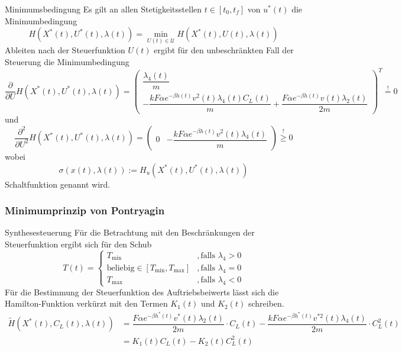\documentclass[aspectratio=169]{beamer}
\begin{document}
\begin{frame}
  \begin{block}{Minimumsbedingung}  
  \scriptsize
  Es gilt an allen Stetigkeitsstellen $t \in [t_0,t_f]$ von $u^{\ast}(t)$ die Minimumbedingung \[H(X^{\ast}(t),U^{\ast}(t),\lambda(t)) = \min_{U(t) \in \mathcal{U}} H(X^{\ast}(t),U(t),\lambda(t))\] Ableiten nach der Steuerfunktion $U(t)$ ergibt für den unbeschränkten Fall der Steuerung die Minimumbedingung
    \[\dfrac{\partial}{\partial U} H(X^{\ast}(t),U^{\ast}(t),\lambda(t)) = \begin{pmatrix}
    \dfrac{\lambda_4(t)}{m} \\ 
    - \dfrac{k F \alpha e^{-\beta h(t)} v^2(t) \lambda_4(t) C_L(t)}{m} + \dfrac{F \alpha e^{-\beta h(t)} v(t) \lambda_2(t)}{2m}
    \end{pmatrix}^T \stackrel{!}{=} 0\]
    und 
    \[\dfrac{\partial^2}{\partial U^2} H(X^{\ast}(t),U^{\ast}(t),\lambda(t)) = \begin{pmatrix}
    0 & - \dfrac{k F \alpha e^{-\beta h(t)} v^2(t) \lambda_4(t)}{m} 
    \end{pmatrix} \stackrel{!}{\geq} 0\] wobei \[\sigma(x(t),\lambda(t)) := H_u(X^{\ast}(t),U^{\ast}(t),\lambda(t))\] Schaltfunktion genannt wird. 
  \end{block}
\end{frame}

\begin{frame}
  \frametitle{Minimumprinzip von Pontryagin}
  \begin{block}{Synthesesteuerung}  
  \scriptsize
  Für die Betrachtung mit den Beschränkungen der Steuerfunktion ergibt sich für den Schub
\[T(t) = \left\lbrace \begin{array}{ll}
T_{\min} & ,\text{falls } \lambda_4 > 0  \\ 
\text{beliebig} \in [T_{\min},T_{\max}] & ,\text{falls } \lambda_4 = 0  \\ 
T_{\max} & ,\text{falls } \lambda_4 < 0
\end{array} \right.\]
Für die Bestimmung der Steuerfunktion des Auftriebsbeiwerts lässt sich die Hamilton-Funktion verkürzt mit den Termen $K_1(t)$ und $K_2(t)$ schreiben.
    \[\begin{split}
        \tilde{H}(X^{\ast}(t),C_L(t),\lambda(t)) &= \dfrac{F \alpha e^{-\beta h^{\ast}(t)} v^{\ast}(t) \lambda_2(t)}{2m} \cdot C_L(t) - \dfrac{k F \alpha e^{-\beta h^{\ast}(t)}  v^{\ast 2}(t) \lambda_4(t)}{2m} \cdot C_L^2(t) \\\
        &= K_1(t) C_L(t) - K_2(t) C_L^2(t)
    \end{split}\]
      \end{block}
\end{frame}
\end{document}
